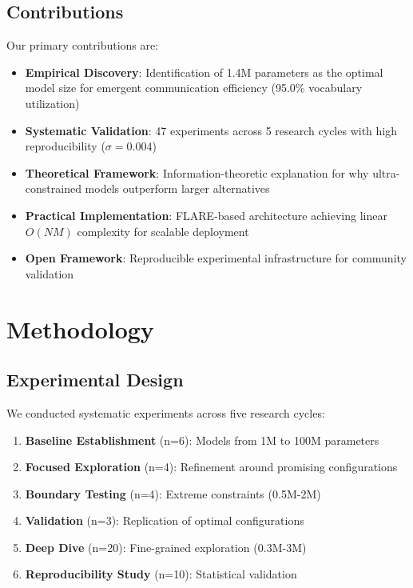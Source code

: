 \documentclass[10pt,twocolumn]{article}
\begin{document}
\subsection{Contributions}

Our primary contributions are:
\begin{itemize}
    \item \textbf{Empirical Discovery}: Identification of 1.4M parameters as the optimal model size for emergent communication efficiency (95.0\% vocabulary utilization)
    \item \textbf{Systematic Validation}: 47 experiments across 5 research cycles with high reproducibility ($\sigma=0.004$)
    \item \textbf{Theoretical Framework}: Information-theoretic explanation for why ultra-constrained models outperform larger alternatives
    \item \textbf{Practical Implementation}: FLARE-based architecture achieving linear $O(NM)$ complexity for scalable deployment
    \item \textbf{Open Framework}: Reproducible experimental infrastructure for community validation
\end{itemize}

\section{Methodology}

\subsection{Experimental Design}

We conducted systematic experiments across five research cycles:
\begin{enumerate}
    \item \textbf{Baseline Establishment} (n=6): Models from 1M to 100M parameters
    \item \textbf{Focused Exploration} (n=4): Refinement around promising configurations
    \item \textbf{Boundary Testing} (n=4): Extreme constraints (0.5M-2M)
    \item \textbf{Validation} (n=3): Replication of optimal configurations
    \item \textbf{Deep Dive} (n=20): Fine-grained exploration (0.3M-3M)
    \item \textbf{Reproducibility Study} (n=10): Statistical validation
\end{enumerate}
\end{document}
